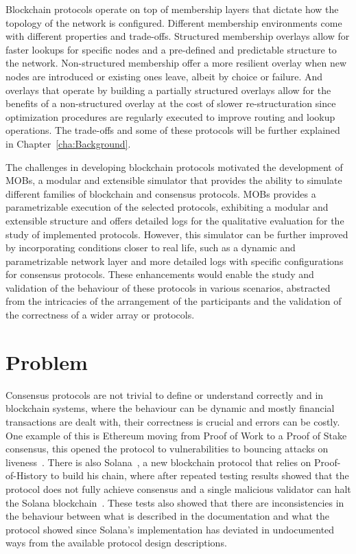 Blockchain protocols operate on top of membership layers that dictate how the topology of the network is configured.
Different membership environments come with different properties and trade-offs. Structured membership overlays allow for faster lookups for
specific nodes and a pre-defined and predictable structure to the network. Non-structured membership offer a more resilient overlay when
new nodes are introduced or existing ones leave, albeit by choice or failure. And overlays that operate by building a partially structured
overlays allow for the benefits of a non-structured overlay at the cost of slower re-structuration since optimization
procedures are regularly executed to improve routing and lookup operations. The trade-offs and some of these protocols will be further
explained in Chapter~\ref{cha:Background}.

The challenges in developing blockchain protocols motivated the development of MOBs, a modular and extensible simulator that provides
the ability to simulate different families of blockchain and consensus protocols.
MOBs provides a parametrizable execution of the selected protocols, exhibiting a modular and extensible structure and offers detailed logs for the
qualitative evaluation for the study of implemented protocols. However, this simulator can be further improved by incorporating conditions closer
to real life, such as a dynamic and parametrizable network layer and more detailed logs with specific configurations for consensus protocols.
These enhancements would enable the study and validation of the behaviour of these protocols in various scenarios, abstracted from the intricacies
of the arrangement of the participants and the validation of the correctness of a wider array or protocols.

\section{Problem}\label{sub:problem}
Consensus protocols are not trivial to define or understand correctly and in blockchain systems, where the behaviour can be dynamic and mostly 
financial transactions are dealt with, their correctness is crucial and errors can be costly. One example of this is Ethereum moving from 
Proof of Work to a Proof of Stake consensus, this opened the protocol to vulnerabilities to bouncing attacks on liveness~\cite{ethereum_analysis}.
There is also Solana~\cite{solana}, a new blockchain protocol that relies on Proof-of-History to build his chain,
where after repeated testing results showed that the protocol does not fully achieve consensus and
a single malicious validator can halt the Solana blockchain~\cite{solana_halting_problem}. These tests also showed that there are
inconsistencies in the behaviour between what is described in the documentation and what the protocol showed since Solana's implementation
has deviated in undocumented ways from the available protocol design descriptions.

